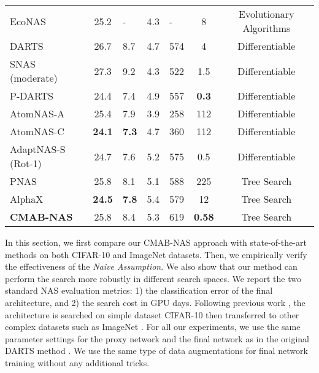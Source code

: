 \documentclass[conference]{IEEEtran}
\begin{document}
\begin{table*}[!t]
\begin{adjustbox}{max width=\textwidth}
\begin{tabular}{lclclcc}
EcoNAS \cite{DBLP:journals/corr/abs-2001-01233} & 25.2 & -    & 4.3 & -    & 8    & Evolutionary Algorithms \\ 
DARTS \cite{liu2018darts}                       & 26.7 & 8.7  & 4.7 & 574  & 4    & Differentiable \\ 
SNAS (moderate) \cite{SNAS}                     & 27.3 & 9.2  & 4.3 & 522  & 1.5  & Differentiable \\
P-DARTS \cite{Chen2019pdarts}                   & 24.4 & 7.4  & 4.9 & 557  & \textbf{0.3}  & Differentiable \\
AtomNAS-A \cite{Mei2020AtomNAS}                 & 25.4 & 7.9  & 3.9 & 258  & 112  & Differentiable \\ 
AtomNAS-C \cite{Mei2020AtomNAS}                 & \textbf{24.1} & \textbf{7.3}  & 4.7 & 360  & 112  & Differentiable \\
AdaptNAS-S (Rot-1) \cite{li2020adapting}        & 24.7 & 7.6  & 5.2 & 575  & 0.5  & Differentiable \\\hline
PNAS \cite{liu2018progressive}                  & 25.8 & 8.1  & 5.1 & 588  & 225  & Tree Search \\ 
AlphaX \cite{wang2019alphax}                    & \textbf{24.5} & \textbf{7.8}  & 5.4 & 579  & 12   & Tree Search \\
\textbf{CMAB-NAS}                               & 25.8 & 8.4  & 5.3 & 619  & \textbf{0.58} & Tree Search \\ \hline
\end{tabular}
\end{adjustbox}
\end{table*}

In this section, we first compare our CMAB-NAS approach with state-of-the-art methods on both CIFAR-10 and ImageNet datasets. 
Then, we empirically verify the effectiveness of the \emph{Naive Assumption}. 
We also show that our method can perform the search more robustly in different search spaces.
We report the two standard NAS evaluation metrics: 1) the classification error of the final architecture, and 2) the search cost in GPU days.
Following previous work \cite{liu2018darts}, the architecture is searched on simple dataset CIFAR-10 \cite{krizhevsky2009learning} then transferred to other complex datasets such as ImageNet \cite{imagenet_cvpr09}.
For all our experiments, we use the same parameter settings for the proxy network and the final network as in the original DARTS method \cite{liu2018darts}. 
We use the same type of data augmentations for final network training without any additional tricks.
\end{document}
